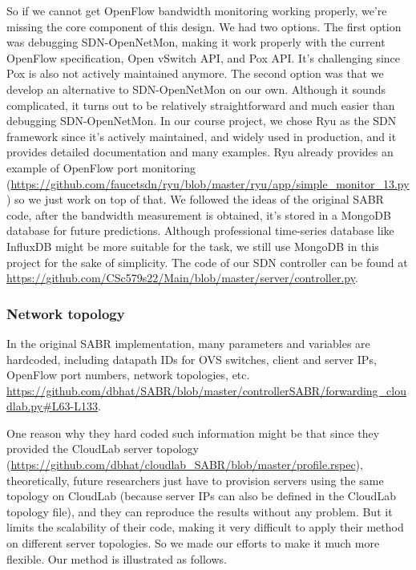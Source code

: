 \documentclass[12pt]{article}
\begin{document}
So if we cannot get OpenFlow bandwidth monitoring working properly, we're missing the core component of this design. We had two options. The first option was debugging SDN-OpenNetMon, making it work properly with the current OpenFlow specification, Open vSwitch API, and Pox API. It's challenging since Pox is also not actively maintained anymore. The second option was that we develop an alternative to SDN-OpenNetMon on our own. Although it sounds complicated, it turns out to be relatively straightforward and much easier than debugging SDN-OpenNetMon. In our course project, we chose Ryu \cite{ryu} as the SDN framework since it's actively maintained, and widely used in production, and it provides detailed documentation and many examples. Ryu already provides an example of OpenFlow port monitoring (\url{https://github.com/faucetsdn/ryu/blob/master/ryu/app/simple_monitor_13.py}) so we just work on top of that. We followed the ideas of the original SABR code, after the bandwidth measurement is obtained, it's stored in a MongoDB database for future predictions. Although professional time-series database like InfluxDB might be more suitable for the task, we still use MongoDB in this project for the sake of simplicity. The code of our SDN controller can be found at \url{https://github.com/CSc579s22/Main/blob/master/server/controller.py}.

\subsubsection{Network topology}
In the original SABR implementation, many parameters and variables are hardcoded, including datapath IDs for OVS switches, client and server IPs, OpenFlow port numbers, network topologies, etc.  \url{https://github.com/dbhat/SABR/blob/master/controllerSABR/forwarding_cloudlab.py#L63-L133}. 

One reason why they hard coded such information might be that since they provided the CloudLab server topology (\url{https://github.com/dbhat/cloudlab_SABR/blob/master/profile.rspec}), theoretically, future researchers just have to provision servers using the same topology on CloudLab (because server IPs can also be defined in the CloudLab topology file), and they can reproduce the results without any problem. But it limits the scalability of their code, making it very difficult to apply their method on different server topologies. So we made our efforts to make it much more flexible. Our method is illustrated as follows.
\end{document}
